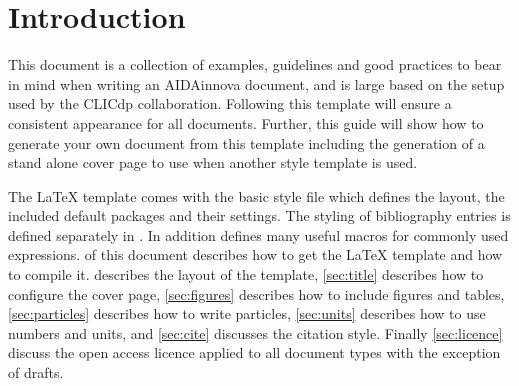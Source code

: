 %

\newcommand{\latex}{\LaTeX\xspace}
\lstset{defaultdialect=[LaTeX]TeX}

\section{Introduction}
\label{sec:Intro}
This document is a collection of examples, guidelines and good practices to bear in mind when writing an AIDAinnova document, and is large based on the setup used by the CLICdp collaboration. Following this template will ensure a consistent appearance for all documents. Further, this guide will show how to generate your own document from this template including the generation of a stand alone cover page to use when another style template is used. 

The \latex template comes with the basic style file  which defines the layout, the included default packages and their settings. The styling of bibliography entries is defined separately in . In addition  defines many useful macros for commonly used expressions.  of this document describes how to get the \latex template and how to compile it.  describes the layout of the template, \cref{sec:title} describes how to configure the cover page, \cref{sec:figures} describes how to include figures and tables, \cref{sec:particles} describes how to write particles, \cref{sec:units} describes how to use numbers and units, and \cref{sec:cite} discusses the citation style. Finally \cref{sec:licence} discuss the open access licence applied to all document types with the exception of drafts.

